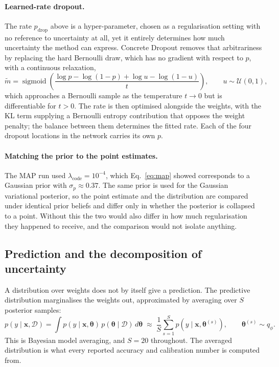 \documentclass{article}
\begin{document}
\paragraph{Learned-rate dropout.}
The rate $p_{\text{drop}}$ above is a hyper-parameter, chosen as a
regularisation setting with no reference to uncertainty at all, yet it entirely
determines how much uncertainty the method can express. Concrete Dropout
\citep{gal2017concrete} removes that arbitrariness by replacing the hard
Bernoulli draw, which has no gradient with respect to $p$, with a continuous
relaxation,
\begin{equation}
\tilde{m} = \operatorname{sigmoid}\!\left(
\frac{\log p - \log(1-p) + \log u - \log(1-u)}{t}\right),
\qquad u \sim \mathcal{U}(0,1),
\label{eq:concrete}
\end{equation}
which approaches a Bernoulli sample as the temperature $t \to 0$ but is
differentiable for $t > 0$. The rate is then optimised alongside the weights,
with the KL term supplying a Bernoulli entropy contribution that opposes the
weight penalty; the balance between them determines the fitted rate. Each of the
four dropout locations in the network carries its own $p$.

\paragraph{Matching the prior to the point estimates.}
The MAP run used $\lambda_{\text{code}} = 10^{-4}$, which
Eq.~\eqref{eq:map} showed corresponds to a Gaussian prior with
$\sigma_p \approx 0.37$. The same prior is used for the Gaussian variational
posterior, so the point estimate and the distribution are compared under
identical prior beliefs and differ only in whether the posterior is collapsed to
a point. Without this the two would also differ in how much regularisation they
happened to receive, and the comparison would not isolate anything.

\subsection{Prediction and the decomposition of uncertainty}
\label{sec:decomposition}

A distribution over weights does not by itself give a prediction. The predictive
distribution marginalises the weights out, approximated by averaging over $S$
posterior samples:
\begin{equation}
p(y \mid \mathbf{x}, \mathcal{D})
= \int p(y \mid \mathbf{x}, \boldsymbol{\theta})\,
       p(\boldsymbol{\theta} \mid \mathcal{D})\, d\boldsymbol{\theta}
\;\approx\; \frac{1}{S}\sum_{s=1}^{S}
       p(y \mid \mathbf{x}, \boldsymbol{\theta}^{(s)}),
\qquad \boldsymbol{\theta}^{(s)} \sim q_\phi.
\label{eq:bma}
\end{equation}
This is Bayesian model averaging, and $S = 20$ throughout. The averaged
distribution is what every reported accuracy and calibration number is computed
from.
\end{document}
